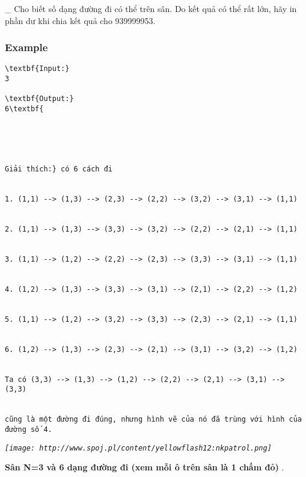    \_ Cho biết số dạng đường đi có thể trên sân. Do kết quả có thể rất lớn, hãy in phần dư khi chia kết quả cho 939999953.  

\subsubsection{   Example  }
\begin{verbatim}
\textbf{Input:}
3

\textbf{Output:}
6\textbf{





Giải thích:} có 6 cách đi


1. (1,1) --> (1,3) --> (2,3) --> (2,2) --> (3,2) --> (3,1) --> (1,1)


2. (1,1) --> (1,3) --> (3,3) --> (3,2) --> (2,2) --> (2,1) --> (1,1)


3. (1,1) --> (1,2) --> (2,2) --> (2,3) --> (3,3) --> (3,1) --> (1,1)


4. (1,2) --> (1,3) --> (3,3) --> (3,1) --> (2,1) --> (2,2) --> (1,2)


5. (1,1) --> (1,2) --> (3,2) --> (3,3) --> (2,3) --> (2,1) --> (1,1)


6. (1,2) --> (1,3) --> (2,3) --> (2,1) --> (3,1) --> (3,2) --> (1,2)


Ta có (3,3) --> (1,3) --> (1,2) --> (2,2) --> (2,1) --> (3,1) --> (3,3) 


cũng là một đường đi đúng, nhưng hình vẽ của nó đã trùng với hình của đường số 4.\end{verbatim}

\emph{
\texttt{[image: http://www.spoj.pl/content/yellowflash12:nkpatrol.png]}}

\textbf{    Sân N=3 và 6 dạng đường đi (xem mỗi ô trên sân là 1 chấm đỏ)   }   .  
